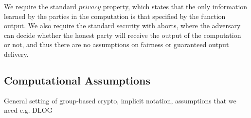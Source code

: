 We require the standard $privacy$ property, which states that the only information learned by the parties in the computation is that specified by the function output.
We also require the standard security with aborts, where the adversary can decide whether the honest party will receive the output of the computation or not, and thus there are no assumptions on fairness or guaranteed output delivery.

\subsection{Computational Assumptions}

\begin{todobox}
    General setting of group-based crypto, implicit notation, assumptions that we need e.g. DLOG 
\end{todobox}
\newpage
